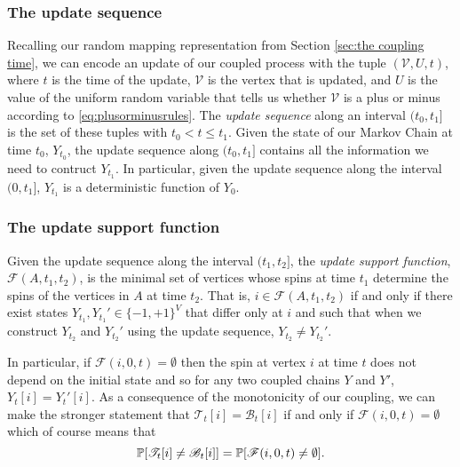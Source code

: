 	\subsubsection{The update sequence}
	Recalling our random mapping representation from Section \ref{sec:the coupling time}, we can encode an update of our coupled process with the tuple $(\mathcal{V}, U, t)$, where $t$ is the time of the update, $\mathcal{V}$ is the vertex that is updated, and $U$ is the value of the uniform random variable that tells us whether $\mathcal{V}$ is a plus or minus according to \eqref{eq:plusorminusrules}. The \emph{update sequence} along an interval $(t_0, t_1]$ is the set of these tuples with $t_0 < t \leq t_1$. Given the state of our Markov Chain at time $t_0$, $Y_{t_0}$, the update sequence along $(t_0, t_1]$ contains all the information we need to contruct $Y_{t_1}$. In particular, given the update sequence along the interval $(0, t_1]$, $Y_{t_1}$ is a deterministic function of $Y_0$.

	\subsubsection{The update support function}
	\label{sec: definition update support function}
	Given the update sequence along the interval $(t_1, t_2]$, the \emph{update support function}, $\mathscr{F}(A, t_1, t_2)$, is the minimal set of vertices whose spins at time $t_1$ determine the spins of the vertices in $A$ at time $t_2$. That is, $i \in \mathscr{F}(A, t_1, t_2)$ if and only if there exist states $Y_{t_1}, Y_{t_1}' \in \{-1, +1\}^{V}$ that differ only at $i$ and such that when we construct $Y_{t_2}$ and $Y_{t_2}'$ using the update sequence, $Y_{t_2} \neq Y_{t_2}'$.

	In particular, if $\mathscr{F}(i, 0, t) = \emptyset$ then the spin at vertex $i$ at time $t$ does not depend on the initial state and so for any two coupled chains $Y$ and $Y'$, $Y_t[i] = Y_t'[i]$. 
	As a consequence of the monotonicity of our coupling, we can make the stronger statement that $\mathscr{T}_t[i] = \mathscr{B}_t[i]$ if and only if $\mathscr{F}(i, 0, t) = \emptyset$ which of course means that
	\begin{equation}
	\label{eq:prob equality of coupling and empty support}
		\mathbb{P}[\mathscr{T}_t[i] \neq \mathscr{B}_t[i]] = \mathbb{P}[\mathscr{F}(i, 0, t) \neq \emptyset].
	\end{equation}

